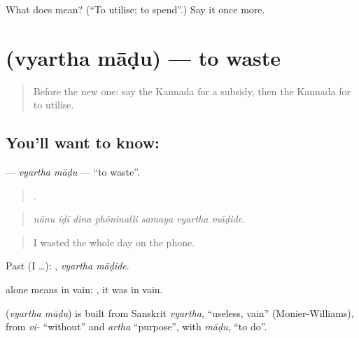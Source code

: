 \begin{tcolorbox}[breakable,colback=teal!4,colframe=teal!35!black,title={Before you move on}]
What does  mean? (\textquotedblleft{}To utilise; to spend\textquotedblright{}.) Say it once more.
\end{tcolorbox}
\section[\texorpdfstring{\kn{ವ್ಯರ್ಥ} \kn{ಮಾಡು} (vyartha māḍu)}{ವ್ಯರ್ಥ ಮಾಡು (vyartha māḍu)}]{  (vyartha māḍu) — to waste}

\label{lesson:KA-C400-vyartha-madu}



\begin{quote}
Before the new one: say the Kannada for a subsidy, then the Kannada for to utilise.
\end{quote}

\subsection*{You'll want to know:  }
\textbf{ } — \emph{vyartha māḍu} — \textquotedblleft{}to waste\textquotedblright{}.

\begin{quote}
      .
\end{quote}

\begin{quote}
\emph{nānu iḍī dina phōninalli samaya vyartha māḍide.}
\end{quote}

\begin{quote}
I wasted the whole day on the phone.
\end{quote}

Past (I …):  , \emph{vyartha māḍide}.

 alone means in vain: , it was in vain.

\begin{cousinweb}
\textbf{ } (\emph{vyartha māḍu}) is built from Sanskrit \emph{vyartha}, \textquotedblleft{}useless, vain\textquotedblright{} (Monier-Williams), from \emph{vi-} \textquotedblleft{}without\textquotedblright{} and \emph{artha} \textquotedblleft{}purpose\textquotedblright{}, with \emph{māḍu}, \textquotedblleft{}to do\textquotedblright{}.
\end{cousinweb}

